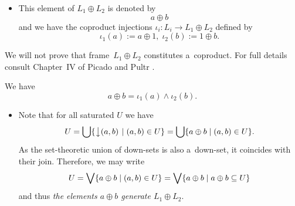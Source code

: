 \begin{itemize}
\item This element of $L_1 \oplus L_2$ is denoted by
\[
  a \oplus b
\]
and we have the coproduct injections $\iota_i: L_i \to L_1 \oplus
L_2$ defined by
\[
  \iota_1(a) := a \oplus 1, \; \iota_2(b) := 1 \oplus b.
\]
\end{itemize}

We will not prove that frame~$L_1 \oplus L_2$ constitutes a~coproduct.
For full details consult Chapter~IV of Picado and Pultr
\cite{picado-pultr12}.

\begin{obs}
 \label{oplus-iota}
We have
\[
  a \oplus b = \iota_1(a) \wedge \iota_2(b).
\]
\end{obs}

\begin{itemize}
\item
Note that for all saturated $U$ we have
\[
  U
  = \bigcup \{ \left\downarrow (a, b) \right. \mid (a, b)\in U \}
  = \bigcup \{ a \oplus b \mid (a, b)\in U \}.
\]
As the set-theoretic union of down-sets is also a~down-set, it coincides with
their join.
Therefore, we may write
\[
  U
  = \bigvee \{ a \oplus b \mid (a, b)\in U \}
  = \bigvee \{ a \oplus b \mid a \oplus b\subseteq U \}
\]
and thus
 \label{a+b-gen}
\emph{the elements $a \oplus b$ generate $L_1 \oplus L_2$\/}.
\end{itemize}

